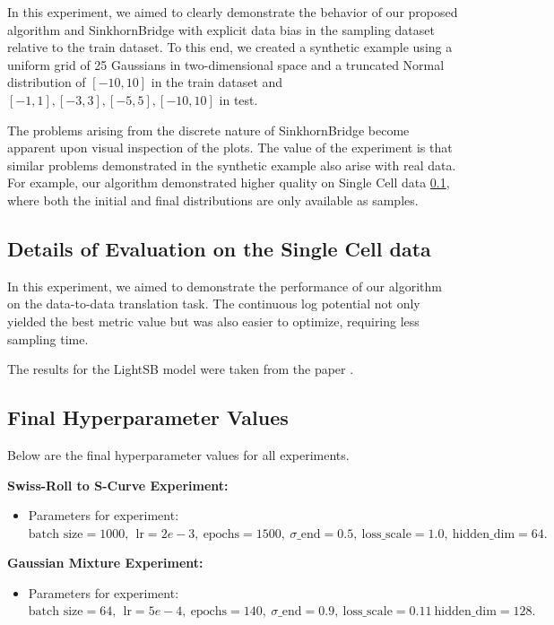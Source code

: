 \documentclass[11pt]{article}
\theoremstyle{remark}
\numberwithin{equation}{section}
\begin{document}
In this experiment, we aimed to clearly demonstrate the behavior of our proposed algorithm and SinkhornBridge with explicit data bias in the sampling dataset relative to the train dataset. To this end, we created a synthetic example using a uniform grid of 25 Gaussians in two-dimensional space and a truncated Normal distribution of $ [-10, 10] $ in the train dataset and $ [-1, 1], [-3, 3], [-5, 5], [-10, 10] $ in test.

The problems arising from the discrete nature of SinkhornBridge become apparent upon visual inspection of the plots. The value of the experiment is that similar problems demonstrated in the synthetic example also arise with real data. For example, our algorithm demonstrated higher quality on Single Cell data \ref{sec:Single_Cell}, where both the initial and final distributions are only available as samples.

\subsection{Details of Evaluation on the Single Cell data} \label{sec:Single_Cell} 

In this experiment, we aimed to demonstrate the performance of our algorithm on the data-to-data translation task. The continuous log potential not only yielded the best metric value but was also easier to optimize, requiring less sampling time.

The results for the LightSB model were taken from the paper \citep{KorotinGushchinBurnaev2024}.

\subsection{Final Hyperparameter Values} \label{sec:hyperparams}

Below are the final hyperparameter values for all experiments.

\noindent \textbf{Swiss-Roll to S-Curve Experiment:} 
\begin{itemize}
\item Parameters for experiment: $ \text{batch size} = 1000, ~ ~ \text{lr} = 2e-3, ~ \text{epochs} = 1500, ~ \sigma\text{\_end} = 0.5, ~ \text{loss\_scale} = 1.0, ~ \text{hidden\_dim} = 64. $
\end{itemize}

\noindent \textbf{Gaussian Mixture Experiment:} 
\begin{itemize}
\item Parameters for experiment: $ \text{batch size} = 64, ~ ~ \text{lr} = 5e-4, ~ \text{epochs} = 140, ~ \sigma\text{\_end} = 0.9, ~ \text{loss\_scale} = 0.11 ~ \text{hidden\_dim} = 128. $
\end{itemize}
\end{document}
